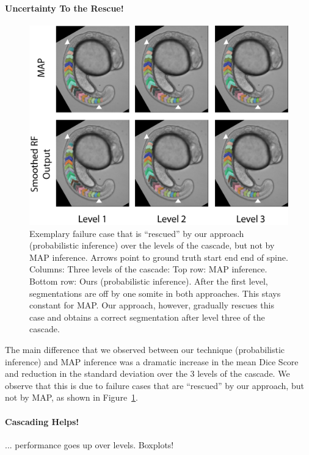 \documentclass[10pt,twocolumn,letterpaper]{article}
\begin{document}
\paragraph{Uncertainty To the Rescue! }
%
\begin{figure}[t]
\begin{center}
\includegraphics[width=\columnwidth]{rescue.png} %
\caption{Exemplary failure case that is ``rescued'' by our approach (probabilistic inference) over the levels of the cascade, but not by MAP inference. Arrows point to ground truth start end end of spine. Columns: Three levels of the cascade: Top row: MAP inference. Bottom row: Ours (probabilistic inference). After the first level, segmentations are off by one somite in both approaches. This stays constant for MAP. Our approach, however, gradually rescues this case and obtains a correct segmentation after level three of the cascade.}
\label{fig:rescue}
\end{center}
\end{figure}
%
The main difference that we observed between our technique (probabilistic inference) and MAP inference was a dramatic increase in the mean Dice Score and reduction in the standard deviation over the 3 levels of the cascade. We observe that this is due to failure cases that are ``rescued'' by our approach, but not by MAP, as shown in Figure~\ref{fig:rescue}.


\paragraph{Cascading Helps!}
... performance goes up over levels. Boxplots!
\end{document}

